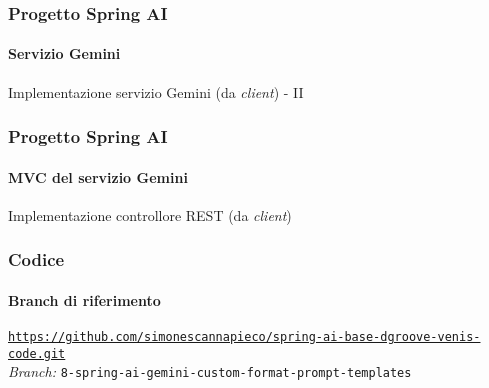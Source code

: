 %
\begin{frame}[t,fragile] \frametitle{Progetto Spring AI}
    \framesubtitle{Servizio Gemini}
    	\vspace*{-.7cm}
        \begin{block}{Implementazione servizio Gemini (da \textit{client}) - II}
{\tiny}
    \end{block}
\end{frame}
%
\begin{frame}[t,fragile] \frametitle{Progetto Spring AI}
    \framesubtitle{MVC del servizio Gemini}
    	\vspace*{-.7cm}
        \begin{block}{Implementazione controllore REST (da \textit{client})}
			{\tiny}
    	\end{block}
\end{frame}
%
\begin{frame}[fragile] \frametitle{Codice}
    \framesubtitle{Branch di riferimento}
	\begin{center}
		{\scriptsize \href{https://github.com/simonescannapieco/spring-ai-base-dgroove-venis-code.git}{\texttt{https://github.com/simonescannapieco/spring-ai-base-dgroove-venis-code.git}}}\\
		\textit{Branch:} \alert{\texttt{8-spring-ai-gemini-custom-format-prompt-templates}}
	\end{center}
\end{frame}